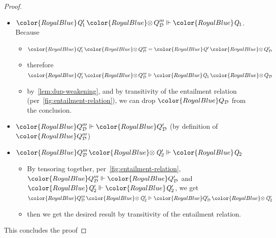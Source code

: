 \documentclass[acmsmall,usenames,dvipsnames,natbib=false,acmthm=false,screen]{acmart}
\newcommand{\constraintcolour}{\color{RoyalBlue}}
\newcommand{\constraintfont}[1]{{\constraintcolour#1}}
\newcommand{\constraintop}[1]{\mathop{\constraintfont{#1}}}
\newcommand{\qtensor}{\constraintop{\otimes}}
\theoremstyle{acmplain}
\theoremstyle{acmdefinition}
\begin{document}
\begin{proof}
\begin{itemize}
\begin{itemize}
    \item $ \constraintfont{ \ottnt{Q'_{{\mathrm{1}}}}  \qtensor  Q_{\mathcal{D} }''' }   \Vdash   \constraintfont{ \ottnt{Q_{{\mathrm{1}}}} } $. Because
      \begin{itemize}
      \item $  \constraintfont{ \ottnt{Q'_{{\mathrm{1}}}}  \qtensor  Q_{\mathcal{D} }''' }   =   \constraintfont{ \ottnt{Q'}  \qtensor  Q_{\mathcal{D} }' }  $
      \item therefore $ \constraintfont{ \ottnt{Q'_{{\mathrm{1}}}}  \qtensor  Q_{\mathcal{D} }''' }   \Vdash   \constraintfont{ \ottnt{Q_{{\mathrm{1}}}}  \qtensor  Q_{\mathcal{D} } } $
      \item by~\cref{lem:dup-weakening}, and by transitivity of the
        entailment relation (per~\cref{fig:entailment-relation}), we
        can drop $  \constraintfont{ Q_{\mathcal{D} } }  $ from the conclusion.
      \end{itemize}
    \item $ \constraintfont{ Q_{\mathcal{D} }''' }   \Vdash   \constraintfont{ Q_{\mathcal{D} }' } $ (by definition of $  \constraintfont{ Q_{\mathcal{D} }''' }  $)
    \item $ \constraintfont{ Q_{\mathcal{D} }'''  \qtensor  \ottnt{Q'_{{\mathrm{2}}}} }   \Vdash   \constraintfont{ \ottnt{Q_{{\mathrm{2}}}} } $
      \begin{itemize}
      \item By tensoring together, per~\cref{fig:entailment-relation},
        $ \constraintfont{ Q_{\mathcal{D} }''' }   \Vdash   \constraintfont{ Q_{\mathcal{D} }' } $ and $ \constraintfont{ \ottnt{Q'_{{\mathrm{2}}}} }   \Vdash   \constraintfont{ \ottnt{Q'_{{\mathrm{2}}}} } $, we get
        $ \constraintfont{ Q_{\mathcal{D} }'''  \qtensor  \ottnt{Q'_{{\mathrm{2}}}} }   \Vdash   \constraintfont{ Q_{\mathcal{D} }'  \qtensor  \ottnt{Q'_{{\mathrm{2}}}} } $
      \item then we get the desired result by transitivity of the
        entailment relation.
      \end{itemize}
    \end{itemize}
  \end{itemize}

  This concludes the proof
\end{proof}
\end{document}
